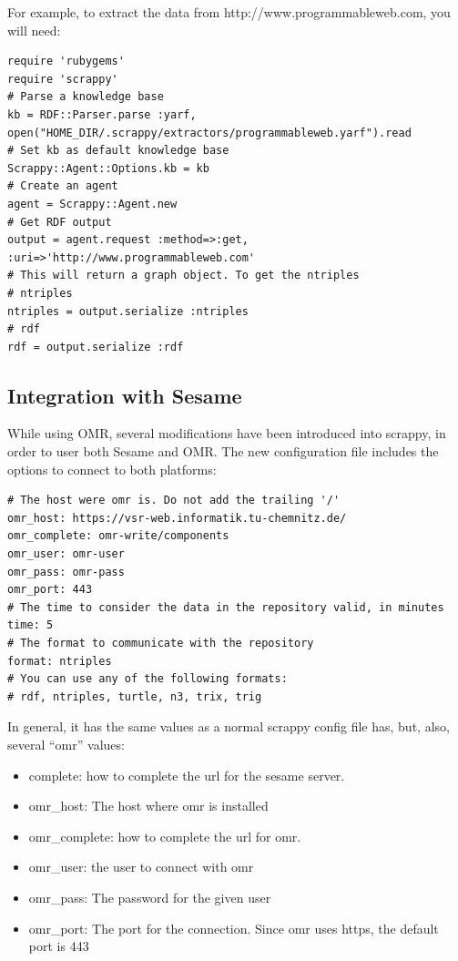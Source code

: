 For example, to extract the data from http://www.programmableweb.com, you will need:

\begin{lstlisting}[style=consola]
require 'rubygems'
require 'scrappy'
# Parse a knowledge base
kb = RDF::Parser.parse :yarf,
open("HOME_DIR/.scrappy/extractors/programmableweb.yarf").read
# Set kb as default knowledge base
Scrappy::Agent::Options.kb = kb
# Create an agent
agent = Scrappy::Agent.new
# Get RDF output
output = agent.request :method=>:get, :uri=>'http://www.programmableweb.com'
# This will return a graph object. To get the ntriples
# ntriples
ntriples = output.serialize :ntriples
# rdf
rdf = output.serialize :rdf
\end{lstlisting}

\subsection{Integration with Sesame}
While using OMR, several modifications have been introduced into scrappy, in order
to user both Sesame and OMR. The new configuration file includes the options to connect to
both platforms:

\newpage
\begin{lstlisting}[style=consola]
# The host were omr is. Do not add the trailing '/'
omr_host: https://vsr-web.informatik.tu-chemnitz.de/
omr_complete: omr-write/components
omr_user: omr-user
omr_pass: omr-pass
omr_port: 443
# The time to consider the data in the repository valid, in minutes
time: 5
# The format to communicate with the repository
format: ntriples
# You can use any of the following formats:
# rdf, ntriples, turtle, n3, trix, trig
\end{lstlisting}

In general, it has the same values as a normal scrappy config file has, but, also, several
“omr” values:

\begin{itemize}
\item complete: how to complete the url for the sesame server.
\item omr\_host: The host where omr is installed
\item omr\_complete: how to complete the url for omr.
\item omr\_user: the user to connect with omr
\item omr\_pass: The password for the given user
\item omr\_port: The port for the connection. Since omr uses https, the default port is 443
\end{itemize}


